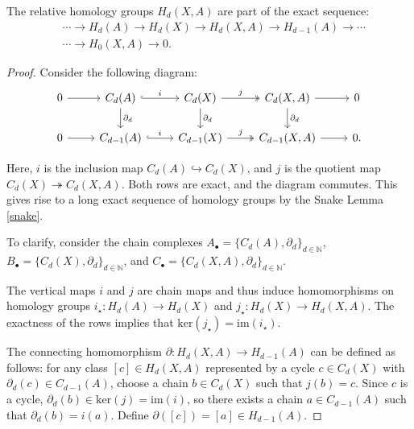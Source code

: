 \begin{theorem}{\cite[p.115ff]{hatcher2005algebraic}}
The relative homology groups \( H_{d}(X, A) \) are part of the exact sequence:
\begin{align}
&\cdots \rightarrow H_{d}(A) \rightarrow H_{d}(X) \rightarrow H_{d}(X, A) \rightarrow H_{d-1}(A) \rightarrow \cdots \\
&\cdots \rightarrow H_{0}(X, A) \rightarrow 0.
\end{align}
\end{theorem}

\begin{proof}
Consider the following diagram:
\begin{equation}
\begin{tikzcd}
0 \arrow[r] & C_d(A) \arrow[r, "i", hook] \arrow[d, "\partial_d"] & C_d(X) \arrow[r, "j", two heads] \arrow[d, "\partial_d"] & C_d(X, A) \arrow[r] \arrow[d, "\partial_d"] & 0 \\
0 \arrow[r] & C_{d-1}(A) \arrow[r, "i", hook] & C_{d-1}(X) \arrow[r, "j", two heads] & C_{d-1}(X, A) \arrow[r] & 0.
\end{tikzcd}
\end{equation}

Here, \(i\) is the inclusion map \(C_{d}(A) \hookrightarrow C_{d}(X)\), and \(j\) is the quotient map \(C_{d}(X) \twoheadrightarrow C_{d}(X, A)\). Both rows are exact, and the diagram commutes. This gives rise to a long exact sequence of homology groups by the Snake Lemma \ref{snake}.

To clarify, consider the chain complexes \(A_{\bullet} = \{C_{d}(A), \partial_{d}\}_{d \in \mathbb{N}}\), \(B_{\bullet} = \{C_{d}(X), \partial_{d}\}_{d \in \mathbb{N}}\), and \(C_{\bullet} = \{C_{d}(X, A), \partial_{d}\}_{d \in \mathbb{N}}\).

The vertical maps \(i\) and \(j\) are chain maps and thus induce homomorphisms on homology groups \(i_{\star}: H_{d}(A) \rightarrow H_{d}(X)\) and \(j_{\star}: H_{d}(X) \rightarrow H_{d}(X, A)\). The exactness of the rows implies that \(\mathrm{ker}(j_{\star}) = \mathrm{im}(i_{\star})\).

The connecting homomorphism \(\partial: H_{d}(X, A) \rightarrow H_{d-1}(A)\) can be defined as follows: for any class \([c] \in H_{d}(X, A)\) represented by a cycle \(c \in C_{d}(X)\) with \(\partial_{d}(c) \in C_{d-1}(A)\), choose a chain \(b \in C_{d}(X)\) such that \(j(b) = c\). Since \(c\) is a cycle, \(\partial_{d}(b) \in \mathrm{ker}(j) = \mathrm{im}(i)\), so there exists a chain \(a \in C_{d-1}(A)\) such that \(\partial_{d}(b) = i(a)\). Define \(\partial([c]) = [a] \in H_{d-1}(A)\).


\end{proof}
